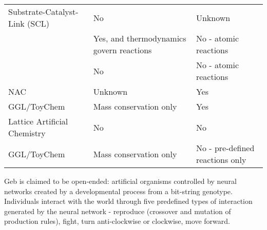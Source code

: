 \begin{table}
\begin{tabular}{@{}p{4cm}p{4.5cm}p{4.5cm}@{}}
		Substrate-Catalyst-Link (SCL) \parencite{Varela:1974qd,Suzuki2008} & No                                                                 & Unknown                                  \\
		\cite{Fernando:2008xy,Fernando:2007pf}                             & Yes, and thermodynamics govern reactions                           & No - atomic reactions                    \\
		\cite{Gardiner2007}                                                & No                                                                 & No - atomic reactions                    \\
		NAC \parencite{Suzuki2006}                                         & Unknown                                                            & Yes                                      \\						
		GGL/ToyChem \parencite{Benko2005}                                  & Mass conservation only                                             & Yes                                      \\
		Lattice Artificial Chemistry \parencite{Ono2000,Madina2003}        & No                                                                 & No                                       \\
		GGL/ToyChem \parencite{Benko2003}                                  & Mass conservation only                                             & No - pre-defined reactions only          \\
		\hline
	\end{tabular}
\end{table}



Geb \cite{Channon:iw,Channon:2001ly} is claimed to be open-ended: artificial organisms controlled by neural networks created by a developmental process from a bit-string genotype. Individuals interact with the world through five predefined types of interaction generated by the neural network - reproduce (crossover and mutation of production rules), fight, turn anti-clockwise or clockwise, move forward.

